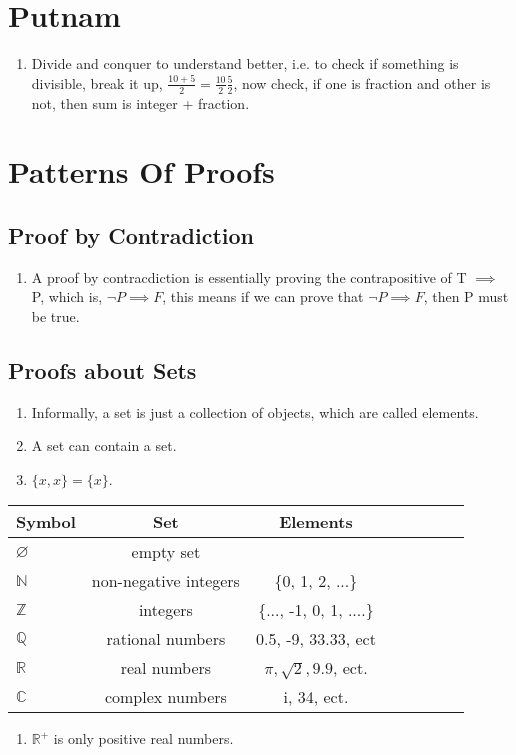 \documentclass{article}
\begin{document}
	\section{Putnam}
	\begin{enumerate}
		\item  Divide and conquer to understand better, i.e. to check if something is divisible, break it up, $\frac{10 + 5}{2} = \frac{10}{2} \frac{5}{2}$, now check, if one is fraction and other is not, then sum is integer + fraction.
	\end{enumerate}
	\section{Patterns Of Proofs}
	\subsection{Proof by Contradiction}
\begin{enumerate}

\item A proof by contracdiction is essentially proving the contrapositive of T $\implies$ P, which is, $\neg P \implies F$, this means if we can prove that $\neg P \implies F$, then P must be true.
\end{enumerate}
\subsection{Proofs about Sets}
\begin{enumerate}
	\item Informally, a set is just a collection of objects, which are called elements.
	\item A set can contain a set.
	\item $\{x, x\} = \{x\}$.
\end{enumerate}

\begin{tabular}{l*{6}{c}r}
Symbol          & Set & Elements\\
\hline
$\varnothing$ & empty set & \\
$\mathbb{N}$ & non-negative integers& \{0, 1, 2, ...\}  \\
$\mathbb{Z}$ & integers& \{..., -1, 0, 1, ....\}  \\
$\mathbb{Q}$ & rational numbers & 0.5, -9, 33.33, ect  \\
$\mathbb{R}$   &  real numbers & $\pi, \sqrt{2}, 9.9$,  ect. \\
$\mathbb{C}$  & complex numbers &  i, 34, ect.  \\
\end{tabular}
\begin{enumerate}
	\item $\mathbb{R}^{+}$ is only positive real numbers.
\end{enumerate}
\end{document}
